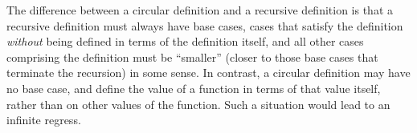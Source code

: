 The difference between a circular definition and a recursive definition is that a recursive definition must always have base cases, cases that satisfy the definition \emph{without} being defined in terms of the definition itself, and all other cases comprising the definition must be ``smaller'' (closer to those base cases that terminate the recursion) in some sense. In contrast, a circular definition may have no base case, and define the value of a function in terms of that value itself, rather than on other values of the function. Such a situation would lead to an infinite regress.

